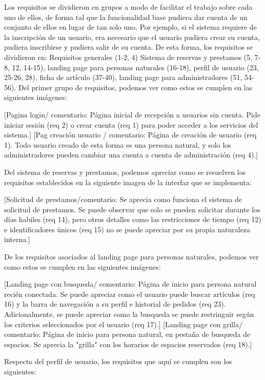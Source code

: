 Los requisitos se dividieron en grupos a modo de facilitar el trabajo sobre cada uno de ellos, de forma tal que la funcionalidad base pudiera dar cuenta de un conjunto de ellos en lugar de tan solo uno. Por ejemplo, si el sistema requiere de la inscripción de un usuario, era necesario que el usuario pudiera crear su cuenta, pudiera inscribirse y pudiera salir de su cuenta.
De esta forma, los requisitos se dividieron en: Requisitos generales (1-2, 4) Sistema de reservas y prestamos (5, 7-8, 12, 14-15), landing page para personas naturales (16-18), perfil de usuario (23, 25-26, 28), ficha de artículo (37-40), landing page para administradores (51, 54-56).
Del primer grupo de requisitos, podemos ver como estos se cumplen en las siguientes imágenes:

[Pagina login/ comentario: Página inicial de recepción a usuarios sin cuenta. Pide iniciar sesión (req 2) o crear cuenta (req 1) para poder acceder a los servicios del sistema.]
[Pag creación usuario / comentario: Página de creación de usuario (req 1). Todo usuario creado de esta forma es una persona natural, y solo los administradores pueden cambiar una cuenta a cuenta de administración (req 4).]

Del sistema de reservas y prestamos, podemos apreciar como se resuelven los requisitos establecidos en la siguiente imagen de la interfaz que se implementa:

[Solicitud de prestamos/comentario: Se aprecia como funciona el sistema de solicitud de prestamos. Se puede observar que solo se pueden solicitar durante los días habiles (req 14), pero otros detalles como las restricciones de tiempo (req 12) e identificadores únicos (req 15) no se puede apreciar por su propia naturaleza interna.]

De los requisitos asociados al landing page para personas naturales, podemos ver como estos se cumplen en las siguientes imágenes:

[Landing page con busqueda/ comentario: Página de inicio para persona natural recién conectada. Se puede apreciar como el usuario puede buscar artículos (req 16) y la barra de navegación a su perfil e historial de pedidos (req 23). Adicionalmente, se puede apreciar como la busqueda se puede restringuir según los criterios seleccionados por el usuario (req 17).]
[Landing page con grilla/ comentario: Página de inicio para persona natural, en pestaña de busqueda de espacios. Se aprecia la "grilla" con los horarios de espacios reservados (req 18).]

Respecto del perfil de usuario, los requisitos que aquí se cumplen son los siguientes:

